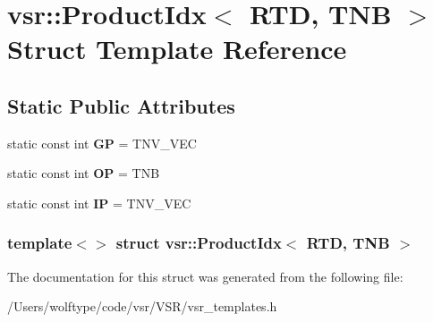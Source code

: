 \hypertarget{structvsr_1_1_product_idx_3_01_r_t_d_00_01_t_n_b_01_4}{\section{vsr\-:\-:Product\-Idx$<$ R\-T\-D, T\-N\-B $>$ Struct Template Reference}
\label{structvsr_1_1_product_idx_3_01_r_t_d_00_01_t_n_b_01_4}
}
\subsection*{Static Public Attributes}
\begin{DoxyCompactItemize}
\item 
\hypertarget{structvsr_1_1_product_idx_3_01_r_t_d_00_01_t_n_b_01_4_a6a661ccd316baaae02fddfac28598862}{static const int {\bfseries G\-P} = T\-N\-V\-\_\-\-V\-E\-C}\label{structvsr_1_1_product_idx_3_01_r_t_d_00_01_t_n_b_01_4_a6a661ccd316baaae02fddfac28598862}

\item 
\hypertarget{structvsr_1_1_product_idx_3_01_r_t_d_00_01_t_n_b_01_4_aca0bfc081e4e19eecc322c126b2a6b44}{static const int {\bfseries O\-P} = T\-N\-B}\label{structvsr_1_1_product_idx_3_01_r_t_d_00_01_t_n_b_01_4_aca0bfc081e4e19eecc322c126b2a6b44}

\item 
\hypertarget{structvsr_1_1_product_idx_3_01_r_t_d_00_01_t_n_b_01_4_a9bfc54def7bee6c9164b6999cfd974f4}{static const int {\bfseries I\-P} = T\-N\-V\-\_\-\-V\-E\-C}\label{structvsr_1_1_product_idx_3_01_r_t_d_00_01_t_n_b_01_4_a9bfc54def7bee6c9164b6999cfd974f4}

\end{DoxyCompactItemize}
\subsubsection*{template$<$$>$ struct vsr\-::\-Product\-Idx$<$ R\-T\-D, T\-N\-B $>$}



The documentation for this struct was generated from the following file\-:\begin{DoxyCompactItemize}
\item 
/\-Users/wolftype/code/vsr/\-V\-S\-R/vsr\-\_\-templates.\-h\end{DoxyCompactItemize}
